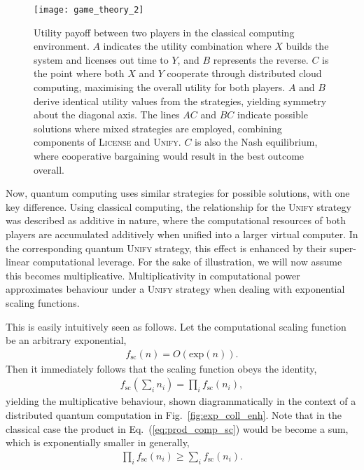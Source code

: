 \begin{figure}[!htbp]
\texttt{[image: game\_theory\_2]}
\captionspacefig \caption{Utility payoff between two players in the classical computing environment. $A$ indicates the utility combination where $X$ builds the system and licenses out time to $Y$, and $B$ represents the reverse. $C$ is the point where both $X$ and $Y$ cooperate through distributed cloud computing, maximising the overall utility for both players. $A$ and $B$ derive identical utility values from the strategies, yielding symmetry about the diagonal axis. The lines $AC$ and $BC$ indicate possible solutions where mixed strategies  are employed, combining components of \textsc{License} and \textsc{Unify}. $C$ is also the Nash equilibrium, where cooperative bargaining would result in the best outcome overall.}\label{fig:game_theory_2}
\end{figure}

Now, quantum computing uses similar strategies for possible solutions, with one key difference. Using classical computing, the relationship for the \textsc{Unify} strategy was described as additive in nature, where the computational resources of both players are accumulated additively when unified into a larger virtual computer. In the corresponding quantum \textsc{Unify} strategy, this effect is enhanced by their super-linear computational leverage. For the sake of illustration, we will now assume this becomes multiplicative. Multiplicativity in computational power approximates behaviour under a \textsc{Unify} strategy when dealing with exponential scaling functions.

This is easily intuitively seen as follows. Let the computational scaling function be an arbitrary exponential,
\begin{align}
f_\mathrm{sc}(n) = O(\mathrm{exp}(n)).	
\end{align}
Then it immediately follows that the scaling function obeys the identity,
\begin{align}\label{eq:prod_comp_sc}
	f_\mathrm{sc}\left(\sum_i n_i \right) = \prod_i f_\mathrm{sc}(n_i),
\end{align}
yielding the multiplicative behaviour, shown diagrammatically in the context of a distributed quantum computation in Fig.~\ref{fig:exp_coll_enh}. Note that in the classical case the product in Eq.~(\ref{eq:prod_comp_sc}) would be become a sum, which is exponentially smaller in generally,
\begin{align}
	\prod_i f_\mathrm{sc}(n_i) \geq \sum_i f_\mathrm{sc}(n_i).
\end{align}

